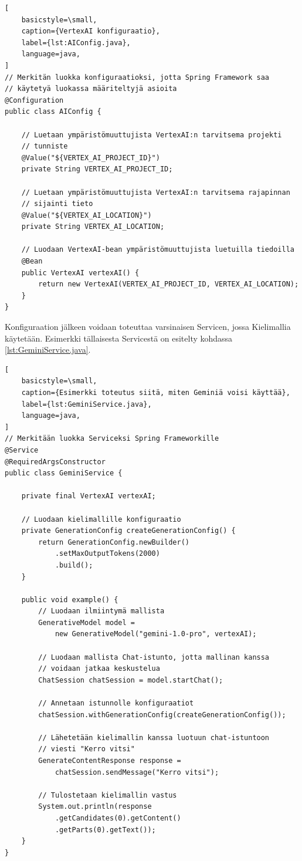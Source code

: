 \begin{lstlisting}[
    basicstyle=\small,
    caption={VertexAI konfiguraatio},
    label={lst:AIConfig.java},
    language=java,
]
// Merkitän luokka konfiguraatioksi, jotta Spring Framework saa
// käytetyä luokassa määriteltyjä asioita
@Configuration
public class AIConfig {

    // Luetaan ympäristömuuttujista VertexAI:n tarvitsema projekti
    // tunniste
    @Value("${VERTEX_AI_PROJECT_ID}")
    private String VERTEX_AI_PROJECT_ID;

    // Luetaan ympäristömuuttujista VertexAI:n tarvitsema rajapinnan
    // sijainti tieto
    @Value("${VERTEX_AI_LOCATION}")
    private String VERTEX_AI_LOCATION;

    // Luodaan VertexAI-bean ympäristömuuttujista luetuilla tiedoilla
    @Bean
    public VertexAI vertexAI() {
        return new VertexAI(VERTEX_AI_PROJECT_ID, VERTEX_AI_LOCATION);
    }
}
\end{lstlisting}

Konfiguraation jälkeen voidaan toteuttaa varsinaisen Servicen, jossa
Kielimallia käytetään. Esimerkki tällaisesta Servicestä on esitelty
kohdassa \ref{lst:GeminiService.java}.

\begin{lstlisting}[
    basicstyle=\small,
    caption={Esimerkki toteutus siitä, miten Geminiä voisi käyttää},
    label={lst:GeminiService.java},
    language=java,
]
// Merkitään luokka Serviceksi Spring Frameworkille
@Service
@RequiredArgsConstructor
public class GeminiService {

    private final VertexAI vertexAI;

    // Luodaan kielimallille konfiguraatio
    private GenerationConfig createGenerationConfig() {
        return GenerationConfig.newBuilder()
            .setMaxOutputTokens(2000)
            .build();
    }

    public void example() {
        // Luodaan ilmiintymä mallista
        GenerativeModel model =
            new GenerativeModel("gemini-1.0-pro", vertexAI);

        // Luodaan mallista Chat-istunto, jotta mallinan kanssa
        // voidaan jatkaa keskustelua
        ChatSession chatSession = model.startChat();

        // Annetaan istunnolle konfiguraatiot
        chatSession.withGenerationConfig(createGenerationConfig());

        // Lähetetään kielimallin kanssa luotuun chat-istuntoon
        // viesti "Kerro vitsi"
        GenerateContentResponse response =
            chatSession.sendMessage("Kerro vitsi");

        // Tulostetaan kielimallin vastus
        System.out.println(response
            .getCandidates(0).getContent()
            .getParts(0).getText());
    }
}
\end{lstlisting}


